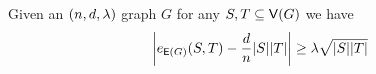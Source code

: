 \documentclass[11pt]{article}
\begin{document}
\begin{lemma}\label{lemma:expanders-mixing-lemma}
  Given an $\EnDeeLambda$ graph $G$ for any $S, T \subseteq \Vertices{G}$ we have
$$
  \left| \CutEdges{S}{T}{\Edges{G}} - \frac{d}{n}|S||T| \right|
  \geq \lambda\sqrt{\Size{S}\Size{T} }
$$
\end{lemma}



  
\end{document}
